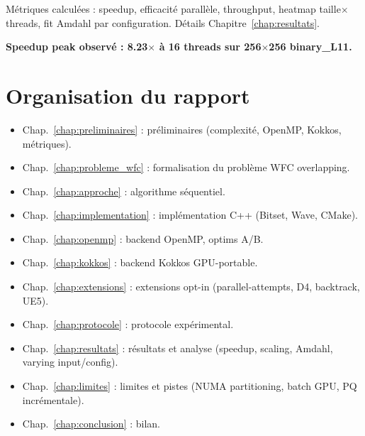 Métriques calculées : speedup, efficacité parallèle, throughput, heatmap taille$\times$threads, fit Amdahl par configuration. Détails Chapitre~\ref{chap:resultats}.

\textbf{Speedup peak observé : 8.23$\times$ à 16 threads sur 256$\times$256 binary\_L11.}

\section{Organisation du rapport}

\begin{itemize}
    \item Chap.~\ref{chap:preliminaires} : préliminaires (complexité, OpenMP, Kokkos, métriques).
    \item Chap.~\ref{chap:probleme_wfc} : formalisation du problème WFC overlapping.
    \item Chap.~\ref{chap:approche} : algorithme séquentiel.
    \item Chap.~\ref{chap:implementation} : implémentation C++ (Bitset, Wave, CMake).
    \item Chap.~\ref{chap:openmp} : backend OpenMP, optims A/B.
    \item Chap.~\ref{chap:kokkos} : backend Kokkos GPU-portable.
    \item Chap.~\ref{chap:extensions} : extensions opt-in (parallel-attempts, D4, backtrack, UE5).
    \item Chap.~\ref{chap:protocole} : protocole expérimental.
    \item Chap.~\ref{chap:resultats} : résultats et analyse (speedup, scaling, Amdahl, varying input/config).
    \item Chap.~\ref{chap:limites} : limites et pistes (NUMA partitioning, batch GPU, PQ incrémentale).
    \item Chap.~\ref{chap:conclusion} : bilan.
\end{itemize}
